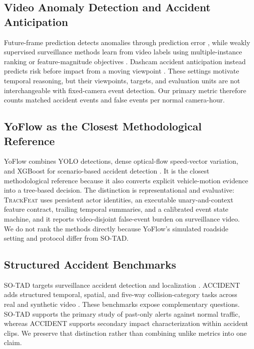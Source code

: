 \documentclass[letterpaper]{article}
\newcommand{\method}{\textsc{TrackFeat}}
\begin{document}
\subsection{Video Anomaly Detection and Accident Anticipation}
Future-frame prediction detects anomalies through prediction error \cite{liu2018future}, while weakly supervised surveillance methods learn from video labels using multiple-instance ranking or feature-magnitude objectives \cite{sultani2018realworld,tian2021rtfm}. Dashcam accident anticipation instead predicts risk before impact from a moving viewpoint \cite{zeng2017agent,bao2021drive,thakur2024graph}. These settings motivate temporal reasoning, but their viewpoints, targets, and evaluation units are not interchangeable with fixed-camera event detection. Our primary metric therefore counts matched accident events and false events per normal camera-hour.

\subsection{YoFlow as the Closest Methodological Reference}
YoFlow combines YOLO detections, dense optical-flow speed-vector variation, and XGBoost for scenario-based accident detection \cite{haryanto2025yoflow}. It is the closest methodological reference because it also converts explicit vehicle-motion evidence into a tree-based decision. The distinction is representational and evaluative: \method{} uses persistent actor identities, an executable unary-and-context feature contract, trailing temporal summaries, and a calibrated event state machine, and it reports video-disjoint false-event burden on surveillance video. We do not rank the methods directly because YoFlow's simulated roadside setting and protocol differ from SO-TAD.

\subsection{Structured Accident Benchmarks}
SO-TAD targets surveillance accident detection and localization \cite{chen2025sotad}. ACCIDENT adds structured temporal, spatial, and five-way collision-category tasks across real and synthetic video \cite{picek2026accident}. These benchmarks expose complementary questions. SO-TAD supports the primary study of past-only alerts against normal traffic, whereas ACCIDENT supports secondary impact characterization within accident clips. We preserve that distinction rather than combining unlike metrics into one claim.
\end{document}
